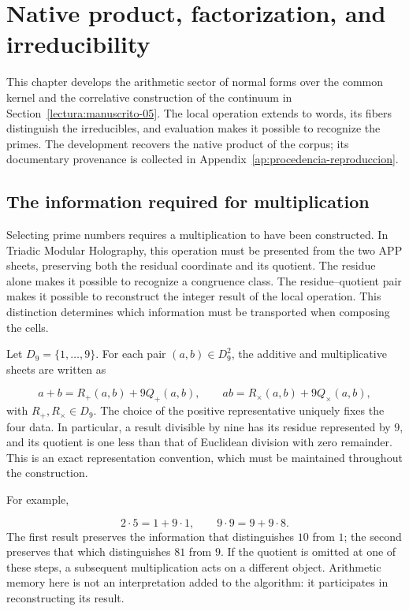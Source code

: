 \section{Native product, factorization, and irreducibility}
\label{lectura:manuscrito-01}
This chapter develops the arithmetic sector of normal forms over the common kernel and the correlative construction of the continuum in Section~\ref{lectura:manuscrito-05}. The local operation extends to words, its fibers distinguish the irreducibles, and evaluation makes it possible to recognize the primes. The development recovers the native product of the corpus; its documentary provenance is collected in Appendix~\ref{ap:procedencia-reproduccion}.

\subsection{The information required for multiplication}
Selecting prime numbers requires a multiplication to have been constructed. In Triadic Modular Holography, this operation must be presented from the two APP sheets, preserving both the residual coordinate and its quotient. The residue alone makes it possible to recognize a congruence class. The residue–quotient pair makes it possible to reconstruct the integer result of the local operation. This distinction determines which information must be transported when composing the cells.

Let $D_9=\{1,\ldots,9\}$. For each pair $(a,b)\in D_9^2$, the additive and multiplicative sheets are written as

\[
a+b=R_+(a,b)+9Q_+(a,b),\qquad
ab=R_\times(a,b)+9Q_\times(a,b),
\]
with $R_+,R_\times\in D_9$. The choice of the positive representative uniquely fixes the four data. In particular, a result divisible by nine has its residue represented by $9$, and its quotient is one less than that of Euclidean division with zero remainder. This is an exact representation convention, which must be maintained throughout the construction.

For example,

\[
2\cdot5=1+9\cdot1,\qquad 9\cdot9=9+9\cdot8.
\]
The first result preserves the information that distinguishes $10$ from $1$; the second preserves that which distinguishes $81$ from $9$. If the quotient is omitted at one of these steps, a subsequent multiplication acts on a different object. Arithmetic memory here is not an interpretation added to the algorithm: it participates in reconstructing its result.

